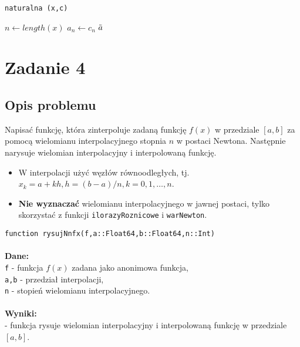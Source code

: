 \documentclass[a4paper]{article}
\begin{document}
    \begin{algorithm}[H]
            \caption{\texttt{naturalna (x,c)}}\label{alg:three}
            $n \gets length(x)$\;
            $a_n \gets c_n $\;
            \Return $\Tilde{a}$\;
        \end{algorithm}


\section{Zadanie 4}
    \subsection{Opis problemu}
    Napisać funkcję, która zinterpoluje zadaną funkcję $f(x)$ w przedziale $[a, b]$ za pomocą wielomianu interpolacyjnego stopnia $n$ w postaci Newtona. Następnie narysuje wielomian interpolacyjny i interpolowaną funkcję.
    \begin{itemize}
        \item W interpolacji użyć węzłów równoodległych, tj. \\
              $x_k = a + kh,\texttt{}h = (b - a)/n, k = 0, 1, \dots, n$.
        \item \textbf{Nie wyznaczać} wielomianu interpolacyjnego w jawnej postaci, tylko skorzystać z funkcji \texttt{ilorazyRoznicowe} i \texttt{warNewton}.
    \end{itemize}
    \texttt{function rysujNnfx(f,a::Float64,b::Float64,n::Int)} \\\\
    \textbf{Dane:}\\
    \texttt{f} - funkcja $f(x)$ zadana jako anonimowa funkcja, \\
    \texttt{a,b} - przedział interpolacji, \\
    \texttt{n} - stopień wielomianu interpolacyjnego. \\\\
    \textbf{Wyniki:}\\
    - funkcja rysuje wielomian interpolacyjny i interpolowaną funkcję w przedziale $[a, b]$.
\end{document}
